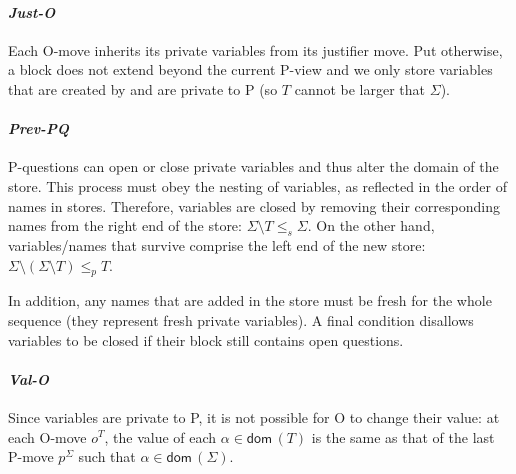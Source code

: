 \documentclass{CSML}
\theoremstyle{definition}\newtheorem{definition}[thm]{Definition}
\theoremstyle{definition}\newtheorem{example}[thm]{Example}
\theoremstyle{definition}\newtheorem{proposition}[thm]{Proposition}
\theoremstyle{definition}\newtheorem{lemma}[thm]{Lemma}
\theoremstyle{definition}\newtheorem{theorem}[thm]{Theorem}
\theoremstyle{definition}\newtheorem{corollary}[thm]{Corollary}
\theoremstyle{definition}\newtheorem{remark}[thm]{Remark}
\renewcommand\Sigma{\varSigma}
\newcommand\Tau{T}
\newcommand\remv{\setminus}
\newcommand\dom[1]{\mathsf{dom}\,#1}
\newcommand\Substore{\leq_p}
\newcommand\substorE{\leq_s}
\newcommand\na\alpha
\begin{document}
\paragraph{\bf\em Just-O}
Each O-move inherits its private variables from its justifier move. Put otherwise, a block does not extend beyond the current P-view and we only store variables that are created by and are private to P (so $T$ cannot be larger that $\Sigma$).

\paragraph{\bf\em Prev-PQ}
P-questions can open or close private variables and thus alter the domain of the store. This process must obey the nesting of variables, as reflected in the order of names in stores. Therefore, 
variables are closed by removing their corresponding names from the right end of the store: $\Sigma\setminus T\substorE\Sigma$.
On the other hand, variables/names that survive comprise the left end of the new store: $\Sigma\remv(\Sigma\remv\Tau)\Substore\Tau$. 

In addition, any names that are added in the store must be fresh for the whole sequence (they represent fresh private variables). A final condition disallows variables to be closed if their block still contains open questions.

\paragraph{\bf\em Val-O}
Since variables are private to P, it is not possible for O to change their value: at each O-move $o^T$, the value of each $\na\in\dom(T)$ is the same as that of the last P-move $p^\Sigma$ such that $\na\in\dom(\Sigma)$.
\medskip
\end{document}
